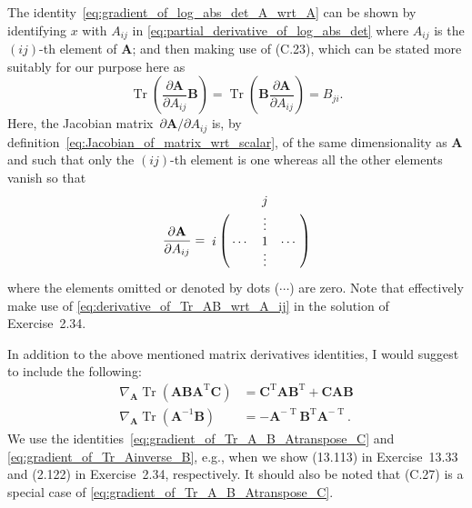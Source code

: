 \documentclass[12pt,a4paper]{article}
\begin{document}
The identity~\eqref{eq:gradient_of_log_abs_det_A_wrt_A} can be shown by
identifying $x$ with $A_{ij}$ in \eqref{eq:partial_derivative_of_log_abs_det}
where $A_{ij}$ is the $(ij)$-th element of $\mathbf{A}$; and
then making use of (C.23), which can be stated more suitably for our purpose here as
\begin{equation}
\operatorname{Tr}\left(\frac{\partial\mathbf{A}}{\partial A_{ij}}\mathbf{B}\right)
= \operatorname{Tr}\left(\mathbf{B}\frac{\partial\mathbf{A}}{\partial A_{ij}}\right)
= B_{ji} .
\label{eq:derivative_of_Tr_AB_wrt_A_ij}
\end{equation}
Here, the Jacobian matrix~$\partial\mathbf{A}/\partial A_{ij}$ is,
by definition~\eqref{eq:Jacobian_of_matrix_wrt_scalar},
of the same dimensionality as $\mathbf{A}$ and
such that only the $(ij)$-th element is one whereas all the other elements vanish so that
\begin{equation}
\frac{\partial\mathbf{A}}{\partial A_{ij}}
= \bordermatrix{
  &        & j      &        \cr
  &        & \vdots &        \cr
i & \cdots & 1      & \cdots \cr
  &        & \vdots &        \cr
}
\end{equation}
where the elements omitted or denoted by dots ($\cdots$) are zero.
Note that \citet{Svensen:PRML_web_solution} effectively make use of
\eqref{eq:derivative_of_Tr_AB_wrt_A_ij} in the solution of Exercise~2.34.

In addition to the above mentioned matrix derivatives identities,
I would suggest to include the following:
\begin{align}
\nabla_{\mathbf{A}} \operatorname{Tr}\left(
\mathbf{A}\mathbf{B}\mathbf{A}^{\operatorname{T}}\mathbf{C} \right) &=
\mathbf{C}^{\operatorname{T}} \mathbf{A} \mathbf{B}^{\operatorname{T}} +
\mathbf{C} \mathbf{A} \mathbf{B}
\label{eq:gradient_of_Tr_A_B_Atranspose_C} \\
\nabla_{\mathbf{A}} \operatorname{Tr}\left(\mathbf{A}^{-1}\mathbf{B}\right) &=
- \mathbf{A}^{-\operatorname{T}} \mathbf{B}^{\operatorname{T}} \mathbf{A}^{-\operatorname{T}}.
\label{eq:gradient_of_Tr_Ainverse_B}
\end{align}
We use the identities~\eqref{eq:gradient_of_Tr_A_B_Atranspose_C} and
\eqref{eq:gradient_of_Tr_Ainverse_B}, e.g.,
when we show (13.113) in Exercise~13.33 and (2.122) in Exercise~2.34, respectively.
It should also be noted that (C.27) is a special case of
\eqref{eq:gradient_of_Tr_A_B_Atranspose_C}.
\end{document}
